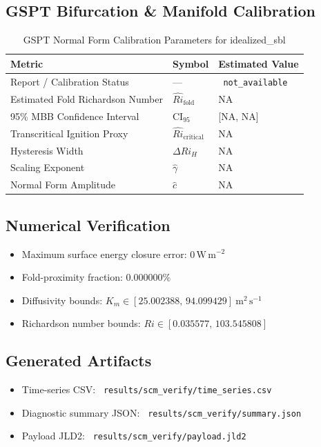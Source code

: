 \subsection{GSPT Bifurcation \& Manifold Calibration}
\begin{table}[htbp]
\centering
\caption{GSPT Normal Form Calibration Parameters for idealized\_sbl}
\label{tab:gspt_calibration_scm_verify_scm_verify_40x4m_0h_report}
\begin{tabular}{lll}
\hline
{\bfseries Metric} & {\bfseries Symbol} & {\bfseries Estimated Value} \\
\hline
Report / Calibration Status & --- & \texttt{ not\_available } \\
Estimated Fold Richardson Number & $\hat{Ri}_{\mathrm{fold}}$ & NA \\
95\% MBB Confidence Interval & CI$_{95}$ & [NA, NA] \\
Transcritical Ignition Proxy & $\hat{Ri}_{\mathrm{critical}}$ & NA \\
Hysteresis Width & $\Delta Ri_H$ & NA \\
Scaling Exponent & $\hat{\gamma}$ & NA \\
Normal Form Amplitude & $\hat{c}$ & NA \\
\hline
\end{tabular}
\end{table}

\subsection{Numerical Verification}
\begin{itemize}
  \item Maximum surface energy closure error:
  $0\,\mathrm{W\,m^{-2}}$
  \item Fold-proximity fraction:
  $0.000000\%$
  \item Diffusivity bounds:
  $K_m \in [25.002388,\,94.099429]~\mathrm{m^2\,s^{-1}}$
  \item Richardson number bounds:
  $Ri \in [0.035577,\,103.545808]$
\end{itemize}

\subsection{Generated Artifacts}
\begin{itemize}
  \item Time-series CSV: \texttt{ results/scm\_verify/time\_series.csv }
  \item Diagnostic summary JSON: \texttt{ results/scm\_verify/summary.json }
  \item Payload JLD2: \texttt{ results/scm\_verify/payload.jld2 }
\end{itemize}


